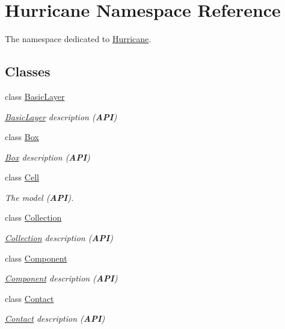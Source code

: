 \hypertarget{namespaceHurricane}{}\section{Hurricane Namespace Reference}
\label{namespaceHurricane}


The namespace dedicated to \hyperlink{namespaceHurricane}{Hurricane}.  


\subsection*{Classes}
\begin{DoxyCompactItemize}
\item 
class \hyperlink{classHurricane_1_1BasicLayer}{Basic\+Layer}
\begin{DoxyCompactList}\small\item\em \hyperlink{classHurricane_1_1BasicLayer}{Basic\+Layer} description ({\bfseries A\+PI}) \end{DoxyCompactList}\item 
class \hyperlink{classHurricane_1_1Box}{Box}
\begin{DoxyCompactList}\small\item\em \hyperlink{classHurricane_1_1Box}{Box} description ({\bfseries A\+PI}) \end{DoxyCompactList}\item 
class \hyperlink{classHurricane_1_1Cell}{Cell}
\begin{DoxyCompactList}\small\item\em The model ({\bfseries A\+PI}). \end{DoxyCompactList}\item 
class \hyperlink{classHurricane_1_1Collection}{Collection}
\begin{DoxyCompactList}\small\item\em \hyperlink{classHurricane_1_1Collection}{Collection} description ({\bfseries A\+PI}) \end{DoxyCompactList}\item 
class \hyperlink{classHurricane_1_1Component}{Component}
\begin{DoxyCompactList}\small\item\em \hyperlink{classHurricane_1_1Component}{Component} description ({\bfseries A\+PI}) \end{DoxyCompactList}\item 
class \hyperlink{classHurricane_1_1Contact}{Contact}
\begin{DoxyCompactList}\small\item\em \hyperlink{classHurricane_1_1Contact}{Contact} description ({\bfseries A\+PI}) \end{DoxyCompactList}\item 

\end{DoxyCompactItemize}
